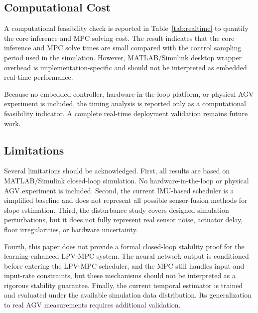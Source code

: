 \documentclass{ieeeaccess}
\begin{document}
\subsection{Computational Cost}



A computational feasibility check is reported in Table~\ref{tab:realtime} to quantify the core inference and MPC solving cost. The result indicates that the core inference and MPC solve times are small compared with the control sampling period used in the simulation. However, MATLAB/Simulink desktop wrapper overhead is implementation-specific and should not be interpreted as embedded real-time performance.

\begin{table}[H]
\centering
{}
\caption{Computational feasibility check.}
\label{tab:realtime}
\end{table}
\FloatBarrier

Because no embedded controller, hardware-in-the-loop platform, or physical AGV experiment is included, the timing analysis is reported only as a computational feasibility indicator. A complete real-time deployment validation remains future work.



\subsection{Limitations}



Several limitations should be acknowledged. First, all results are based on MATLAB/Simulink closed-loop simulation. No hardware-in-the-loop or physical AGV experiment is included. Second, the current IMU-based scheduler is a simplified baseline and does not represent all possible sensor-fusion methods for slope estimation. Third, the disturbance study covers designed simulation perturbations, but it does not fully represent real sensor noise, actuator delay, floor irregularities, or hardware uncertainty.



Fourth, this paper does not provide a formal closed-loop stability proof for the learning-enhanced LPV-MPC system. The neural network output is conditioned before entering the LPV-MPC scheduler, and the MPC still handles input and input-rate constraints, but these mechanisms should not be interpreted as a rigorous stability guarantee. Finally, the current temporal estimator is trained and evaluated under the available simulation data distribution. Its generalization to real AGV measurements requires additional validation.
\end{document}
